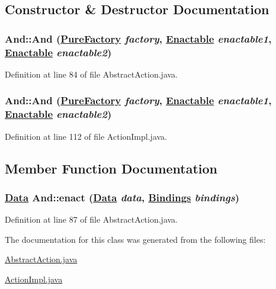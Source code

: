 \subsection{Constructor \& Destructor Documentation}
\hypertarget{classAnd_a0}{
\subsubsection[And]{\setlength{\rightskip}{0pt plus 5cm}And::And (\hyperlink{classPureFactory}{Pure\-Factory} {\em factory}, \hyperlink{interfaceEnactable}{Enactable} {\em enactable1}, \hyperlink{interfaceEnactable}{Enactable} {\em enactable2})}}
\label{classAnd_a0}




Definition at line 84 of file Abstract\-Action.java.\hypertarget{classAnd_a2}{
\subsubsection[And]{\setlength{\rightskip}{0pt plus 5cm}And::And (\hyperlink{classPureFactory}{Pure\-Factory} {\em factory}, \hyperlink{interfaceEnactable}{Enactable} {\em enactable1}, \hyperlink{interfaceEnactable}{Enactable} {\em enactable2})}}
\label{classAnd_a2}




Definition at line 112 of file Action\-Impl.java.

\subsection{Member Function Documentation}
\hypertarget{classAnd_a1}{
\subsubsection[enact]{\setlength{\rightskip}{0pt plus 5cm}\hyperlink{interfaceData}{Data} And::enact (\hyperlink{interfaceData}{Data} {\em data}, \hyperlink{interfaceBindings}{Bindings} {\em bindings})}}
\label{classAnd_a1}




Definition at line 87 of file Abstract\-Action.java.

The documentation for this class was generated from the following files:\begin{CompactItemize}
\item 
\hyperlink{AbstractAction_8java-source}{Abstract\-Action.java}\item 
\hyperlink{ActionImpl_8java-source}{Action\-Impl.java}\end{CompactItemize}
